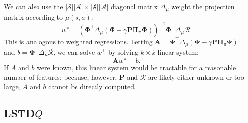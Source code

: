 \documentclass{article}
\newcommand{\parens}[1]{\left(#1\right)}
\newcommand{\abs}[1]{\left|#1\right|}
\begin{document}
We can also use the $\abs{\mathcal{S}}\abs{\mathcal{A}}\times \abs{\mathcal{S}}\abs{\mathcal{A}}$ diagonal matrix $\Delta_{\mu}$ weight the projection matrix according to  $\mu(s,a)$:
\[
	w^{\pi}=\parens{\mathbf{\Phi}^\intercal\Delta_{\mu}\parens{\mathbf{\Phi}-\gamma \mathbf{P}\mathbf{\Pi}_{\pi}\mathbf{\Phi}}}^{-1}\mathbf{\Phi}^\intercal\Delta_{\mu}\mathcal{R}.
\]
This is analogous to weighted regressions. 
Letting $\mathbf{A}=\mathbf{\Phi}^\intercal\Delta_{\mu}\parens{\mathbf{\Phi}-\gamma \mathbf{P}\mathbf{\Pi}_{\pi}\mathbf{\Phi}}$ and $b=\mathbf{\Phi}^\intercal\Delta_{\mu}\mathcal{R}$, we can solve $w^\intercal$ by solving $k\times k$ linear system:
\[
	\mathbf{A}w^{\pi}=b.
\]
If $A$ and $b$ were known, this linear system would be tractable for a reasonable number of features; because, however, $\mathbf{P}$ and $\mathcal{R}$ are likely either unknown or too large, $A$ and $b$ cannot be directly computed. 

\subsection*{LSTD$Q$} %
\label{sub:lstd_q_}

\end{document}
